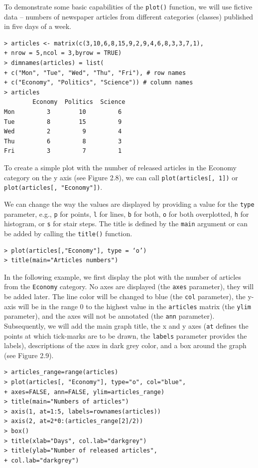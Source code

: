 To demonstrate some basic capabilities of the \texttt{plot()} function, we will use
fictive data – numbers of newspaper articles from different categories (classes)
published in five days of a week.

\begin{verbatim}
> articles <- matrix(c(3,10,6,8,15,9,2,9,4,6,8,3,3,7,1),
+ nrow = 5,ncol = 3,byrow = TRUE)
> dimnames(articles) = list(
+ c("Mon", "Tue", "Wed", "Thu", "Fri"), # row names
+ c("Economy", "Politics", "Science")) # column names
> articles
        Economy  Politics  Science
Mon         3        10         6
Tue         8        15         9
Wed         2         9         4
Thu         6         8         3
Fri         3         7         1
\end{verbatim}

To create a simple plot with the number of released articles in the Economy
category on the y axis (see Figure 2.8), we can call \texttt{plot(articles[, 1])} or
\texttt{plot(articles[, "Economy"])}.

We can change the way the values are displayed by providing a value for the
\texttt{type} parameter, e.g., \texttt{p} for points, \texttt{l} for lines, \texttt{b} for both, 
\texttt{o} for both overplotted, \texttt{h} for histogram, or \texttt{s} for stair steps. 
The title is defined by the \texttt{main} argument or can be added by calling the 
\texttt{title()} function.

\begin{verbatim}
> plot(articles[,"Economy"], type = ‘o’)
> title(main="Articles numbers")
\end{verbatim}

In the following example, we first display the plot with the number of articles from the 
\texttt{Economy} category. No axes are displayed (the \texttt{axes} parameter), they will be added later. 
The line color will be changed to blue (the \texttt{col} parameter), the y-axis will be in the range 
0 to the highest value in the \texttt{articles} matrix (the \texttt{ylim} parameter), and the axes will not be 
annotated (the \texttt{ann} parameter). Subsequently, we will add the main graph title, the x and y axes 
(\texttt{at} defines the points at which tick-marks are to be drawn, the \texttt{labels} parameter provides the 
labels), descriptions of the axes in dark grey color, and a box around the graph (see Figure 2.9).

\begin{verbatim}
> articles_range=range(articles)
> plot(articles[, "Economy"], type="o", col="blue",
+ axes=FALSE, ann=FALSE, ylim=articles_range)
> title(main="Numbers of articles")
> axis(1, at=1:5, labels=rownames(articles))
> axis(2, at=2*0:(articles_range[2]/2))
> box()
> title(xlab="Days", col.lab="darkgrey")
> title(ylab="Number of released articles",
+ col.lab="darkgrey")
\end{verbatim}

